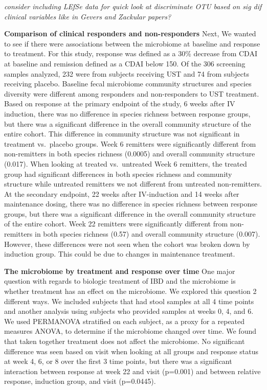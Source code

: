\documentclass[11pt,]{article}
\begin{document}
\emph{consider including LEfSe data for quick look at discriminate OTU
based on sig dif clinical variables like in Gevers and Zackular papers?}

\textbf{Comparison of clinical responders and non-responders} Next, We
wanted to see if there were associations between the microbiome at
baseline and response to treatment. For this study, response was defined
as a 30\% decrease from CDAI at baseline and remission defined as a CDAI
below 150. Of the 306 screening samples analyzed, 232 were from subjects
receiving UST and 74 from subjects receiving placebo. Baseline fecal
microbiome community structures and species diversity were different
among responders and non-responders to UST treatment. Based on response
at the primary endpoint of the study, 6 weeks after IV induction, there
was no difference in species richness between response groups, but there
was a significant difference in the overall community structure of the
entire cohort. This difference in community structure was not
significant in treatment vs.~placebo groups. Week 6 remitters were
significantly different from non-remitters in both species richness
(0.0005) and overall community structure (0.017). When looking at
treated vs.~untreated Week 6 remitters, the treated group had
significant differences in both species richness and community structure
while untreated remitters we not different from untreated non-remitters.
At the secondary endpoint, 22 weeks after IV-induction and 14 weeks
after maintenance dosing, there was no difference in species richness
between response groups, but there was a significant difference in the
overall community structure of the entire cohort. Week 22 remitters were
significantly different from non-remitters in both species richness
(0.57) and overall community structure (0.007). However, these
differences were not seen when the cohort was broken down by induction
group. This could be due to changes in maintenance treatment.

\textbf{The microbiome by treatment and response over time} One major
question with regards to biologic treatment of IBD and the microbiome is
whether treatment has an effect on the microbiome. We explored this
question 2 different ways. We included subjects that had stool samples
at all 4 time points and another analysis using subjects who provided
samples at weeks 0, 4, and 6. We used PERMANOVA stratified on each
subject, as a proxy for a repeated measures ANOVA, to determine if the
microbiome changed over time. We found that taken together treatment
does not affect the microbiome. No significant difference was seen based
on visit when looking at all groups and response status at week 4, 6, or
8 over the first 3 time points, but there was a significant interaction
between response at week 22 and visit (p=0.001) and between relative
response, induction group, and visit (p=0.0445).
\end{document}
